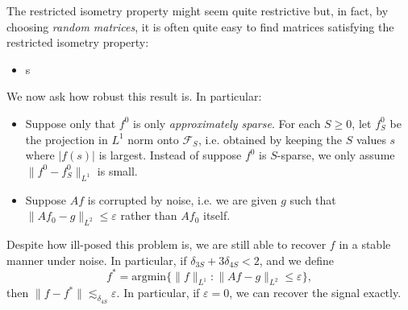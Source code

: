 \documentclass{article}
\theoremstyle{plain}
\begin{document}
The restricted isometry property might seem quite restrictive but, in fact, by choosing \emph{random matrices}, it is often quite easy to find  matrices satisfying the restricted isometry property:
%
\begin{itemize}
    \item s
\end{itemize}

We now ask how robust this result is. In particular:
%
\begin{itemize}
    \item Suppose only that $f^0$ is only \emph{approximately sparse}. For each $S \geq 0$, let $f^0_S$ be the projection in $L^1$ norm onto $\mathcal{F}_S$, i.e. obtained by keeping the $S$ values $s$ where $|f(s)|$ is largest. Instead of suppose $f^0$ is $S$-sparse, we only assume $\| f^0 - f^0_S \|_{L^1}$ is small.

    \item Suppose $Af$ is corrupted by noise, i.e. we are given $g$ such that $\| Af_0 - g \|_{L^2} \leq \varepsilon$ rather than $Af_0$ itself.
\end{itemize}
%
Despite how ill-posed this problem is, we are still able to recover $f$ in a stable manner under noise. In particular, if $\delta_{3S} + 3 \delta_{4S} < 2$, and we define
%
\[ f^* = \text{argmin} \{ \| f \|_{L^1} : \| Af - g \|_{L^2} \leq \varepsilon \}, \]
%
then $\| f - f^* \| \lesssim_{\delta_{4S}} \varepsilon$. In particular, if $\varepsilon = 0$, we can recover the signal exactly.
\end{document}
